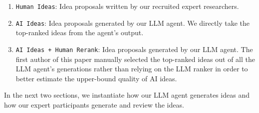 \begin{enumerate}
    \item \texttt{Human Ideas}: Idea proposals written by our recruited expert researchers. 

    \item \texttt{AI Ideas}: Idea proposals generated by our LLM agent. %
    We directly take the top-ranked ideas from the agent's output. 

    \item \texttt{AI Ideas + Human Rerank}: Idea proposals generated by our LLM agent. %
    The first author of this paper manually selected the top-ranked ideas out of all the LLM agent's generations rather than relying on the LLM ranker in order to better estimate the upper-bound quality of AI ideas.%
\end{enumerate}

 
In the next two sections, we instantiate how our LLM agent generates ideas and how our expert participants generate and review the ideas. 








